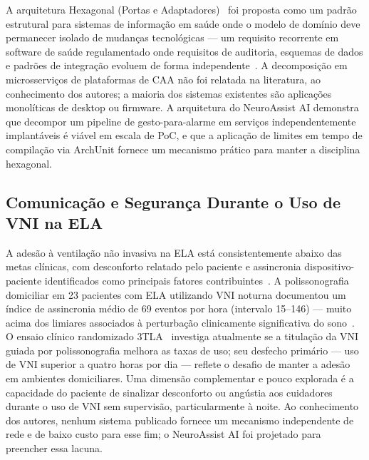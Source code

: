 A arquitetura Hexagonal (Portas e Adaptadores)~\cite{cockburn2005hexagonal} foi
proposta como um padrão estrutural para sistemas de informação em saúde onde o modelo
de domínio deve permanecer isolado de mudanças tecnológicas — um requisito recorrente
em software de saúde regulamentado onde requisitos de auditoria, esquemas de dados e
padrões de integração evoluem de forma independente~\cite{richardson2018microservices}.
A decomposição em microsserviços de plataformas de CAA não foi relatada na literatura,
ao conhecimento dos autores; a maioria dos sistemas existentes são aplicações
monolíticas de desktop ou firmware. A arquitetura do NeuroAssist AI demonstra que
decompor um pipeline de gesto-para-alarme em serviços independentemente implantáveis
é viável em escala de PoC, e que a aplicação de limites em tempo de compilação via
ArchUnit fornece um mecanismo prático para manter a disciplina hexagonal.

\subsection{Comunicação e Segurança Durante o Uso de VNI na ELA}

A adesão à ventilação não invasiva na ELA está consistentemente abaixo das metas
clínicas, com desconforto relatado pelo paciente e assincronia dispositivo-paciente
identificados como principais fatores contribuintes~\cite{berlowitz2021niv, yang2026pva}.
A polissonografia domiciliar em 23 pacientes com ELA utilizando VNI noturna documentou
um índice de assincronia médio de 69 eventos por hora (intervalo 15--146) — muito
acima dos limiares associados à perturbação clinicamente significativa do
sono~\cite{atkeson2011pva}. O ensaio clínico randomizado 3TLA~\cite{berlowitz2025tla}
investiga atualmente se a titulação da VNI guiada por polissonografia melhora as taxas
de uso; seu desfecho primário — uso de VNI superior a quatro horas por dia — reflete
o desafio de manter a adesão em ambientes domiciliares. Uma dimensão complementar e
pouco explorada é a capacidade do paciente de sinalizar desconforto ou angústia aos
cuidadores durante o uso de VNI sem supervisão, particularmente à noite. Ao conhecimento
dos autores, nenhum sistema publicado fornece um mecanismo independente de rede e de
baixo custo para esse fim; o NeuroAssist AI foi projetado para preencher essa lacuna.

